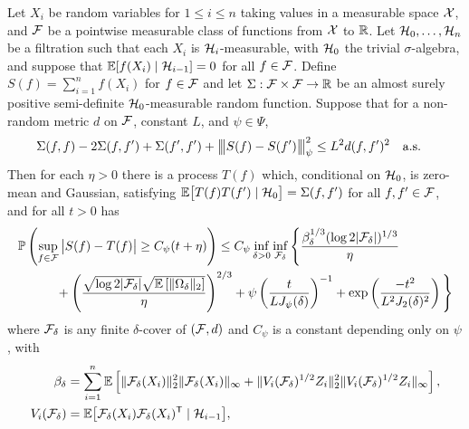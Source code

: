 \begin{proposition}%
  \label{pro:yurinskii_emp_proc}

  Let $X_i$ be random variables for $1 \leq i \leq n$ taking values in a
  measurable space $\mathcal{X}$, and $\mathcal{F}$ be a pointwise measurable class of
  functions from $\mathcal{X}$ to $\mathbb{R}$. Let $\mathcal{H}_0, \ldots, \mathcal{H}_n$ be a filtration such
  that each $X_i$ is $\mathcal{H}_i$-measurable, with $\mathcal{H}_0$ the trivial
  $\sigma$-algebra, and suppose that $\mathbb{E}[f(X_i) \mid \mathcal{H}_{i-1}] = 0$ for all
  $f \in \mathcal{F}$. Define $S(f) = \sum_{i=1}^n f(X_i)$ for $f\in\mathcal{F}$ and let
  $\Sigma: \mathcal{F} \times \mathcal{F} \to \mathbb{R}$ be an almost surely positive semi-definite
  $\mathcal{H}_0$-measurable random function. Suppose that for a non-random
  metric $d$ on $\mathcal{F}$, constant $L$, and $\psi \in \Psi$,
  \begin{align}%
    \label{eq:yurinskii_emp_proc_var}
    \Sigma(f,f) - 2\Sigma(f,f') + \Sigma(f',f')
    + \bigvvvert S(f) - S(f') \bigvvvert_\psi^2
    &\leq L^2 d(f,f')^2 \quad \text{a.s.}
  \end{align}
  Then for each $\eta > 0$ there is a process $T(f)$
  which, conditional on $\mathcal{H}_0$, is zero-mean and Gaussian,
  satisfying $\mathbb{E}\big[ T(f) T(f') \mid \mathcal{H}_0 \big] = \Sigma(f,f')$
  for all $f, f' \in \mathcal{F}$, and for all $t > 0$ has
  \begin{align*}
    &\mathbb{P}\left(
      \sup_{f \in \mathcal{F}}
      \big| S(f) - T(f) \big|
      \geq C_\psi(t + \eta)
    \right)
    \leq
    C_\psi
    \inf_{\delta > 0}
    \inf_{\mathcal{F}_\delta}
    \Bigg\{
      \frac{\beta_\delta^{1/3} (\log 2 |\mathcal{F}_\delta|)^{1/3}}{\eta } \\
      &\qquad\quad+
      \left(\frac{\sqrt{\log 2 |\mathcal{F}_\delta|}
      \sqrt{\mathbb{E}\left[\|\Omega_\delta\|_2\right]}}{\eta }\right)^{2/3}
      + \psi\left(\frac{t}{L J_\psi(\delta)}\right)^{-1}
      + \exp\left(\frac{-t^2}{L^2 J_2(\delta)^2}\right)
    \Bigg\}
  \end{align*}
  where $\mathcal{F}_\delta$ is any finite $\delta$-cover of $(\mathcal{F},d)$
  and $C_\psi$ is a constant depending only on $\psi$, with
  \begin{align*}
    \beta_\delta
    &= \sum_{i=1}^n
    \E\left[ \|\cF_\delta(X_i)\|^2_2\|\cF_\delta(X_i)\|_\infty
      + \|V_i(\cF_\delta)^{1/2}Z_i\|^2_2
    \|V_i(\cF_\delta)^{1/2}Z_i\|_\infty \right], \\
    V_i(\cF_\delta)
    &=
    \E\big[\cF_\delta(X_i) \cF_\delta(X_i)^\T \mid \cH_{i-1} \big],
    \hspace*{27.7mm}

\end{align*}
\end{proposition}
